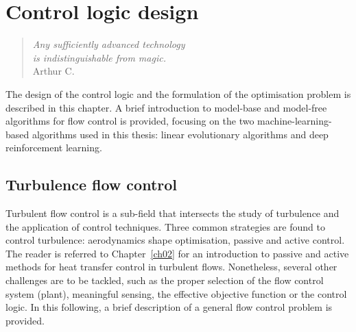 \chapter{Control logic design}\label{ch03}
%
\begin{quote}
    \begin{flushright}
        \textit{Any sufficiently advanced technology \\
        is indistinguishable from magic.}\\
        \vspace{0.2cm}
        Arthur C. \citet{Clarke1968law3} \\
    \end{flushright}
\end{quote}
\vspace{1cm}

The design of the control logic and the formulation of the optimisation problem is described in this chapter. A brief introduction to model-base and model-free algorithms for flow control is provided, focusing on the two machine-learning-based algorithms used in this thesis: linear evolutionary algorithms and deep reinforcement learning.

\section{Turbulence flow control}

Turbulent flow control is a sub-field that intersects the study of turbulence and the application of control techniques. Three common strategies are found to control turbulence: aerodynamics shape optimisation, passive and active control. The reader is referred to Chapter~\ref{ch02} for an introduction to passive and active methods for heat transfer control in turbulent flows. Nonetheless, several other challenges are to be tackled, such as the proper selection of the flow control system (plant), meaningful sensing, the effective objective function or the control logic. In this following, a brief description of a general flow control problem is provided.

